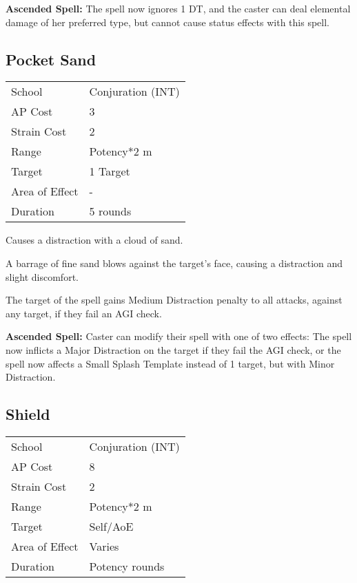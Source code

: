 \documentclass[11pt,a4paper,twocolumn]{book}
\begin{document}
\bigskip

\textbf{Ascended Spell:} The spell now ignores 1 DT, and the caster can deal elemental damage of her preferred type, but cannot cause status effects with this spell.

\vfill

\subsection*{Pocket Sand}
{
	\begin{tabu} to 75mm{| X[l,4] | X[l,7] |}
		\hline
		School         & Conjuration (INT) \\
		AP Cost        & 3                 \\
		Strain Cost    & 2                 \\
		Range          & Potency*2 m       \\
		Target         & 1 Target          \\
		Area of Effect & -                 \\
		Duration       & 5 rounds          \\ \hline
	\end{tabu}
	
}

\medskip

Causes a distraction with a cloud of sand.

A barrage of fine sand blows against the target's face, causing a distraction and slight discomfort.

The target of the spell gains Medium Distraction penalty to all attacks, against any target, if they fail an AGI check.

\bigskip

\textbf{Ascended Spell:} Caster can modify their spell with one of two effects: The spell now inflicts a Major Distraction on the target if they fail the AGI check, or the spell now affects a Small Splash Template instead of 1 target, but with Minor Distraction.


\subsection*{Shield}
{
	\begin{tabu} to 75mm{| X[l,4] | X[l,7] |}
		\hline
		School 			& Conjuration (INT) 		\\
		AP Cost	      	& 8 						\\
		Strain Cost     & 2 						\\
		Range     		& Potency*2	m				\\
		Target      	& Self/AoE					\\
		Area of Effect  & Varies  	 				\\
		Duration     	& Potency rounds			\\ \hline
	\end{tabu}
	
}
\end{document}
